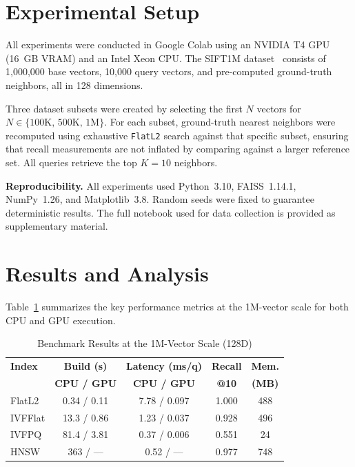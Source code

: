 \documentclass[conference]{IEEEtran}
\begin{document}
\section{Experimental Setup}
All experiments were conducted in Google Colab using an NVIDIA T4 GPU (16~GB VRAM) and an Intel Xeon CPU. The SIFT1M dataset~\cite{annbench2022} consists of 1,000,000 base vectors, 10,000 query vectors, and pre-computed ground-truth neighbors, all in 128 dimensions.

Three dataset subsets were created by selecting the first $N$ vectors for $N\in\{100\textrm{K},\,500\textrm{K},\,1\textrm{M}\}$. For each subset, ground-truth nearest neighbors were recomputed using exhaustive \texttt{FlatL2} search against that specific subset, ensuring that recall measurements are not inflated by comparing against a larger reference set. All queries retrieve the top $K\!=\!10$ neighbors.

\textbf{Reproducibility.} All experiments used Python~3.10, FAISS~1.14.1, NumPy~1.26, and Matplotlib~3.8. Random seeds were fixed to guarantee deterministic results. The full notebook used for data collection is provided as supplementary material.

\section{Results and Analysis}

Table~\ref{tab:results} summarizes the key performance metrics at the 1M-vector scale for both CPU and GPU execution.

\begin{table}[htbp]
\caption{Benchmark Results at the 1M-Vector Scale (128D)}
\label{tab:results}
\centering
\begin{tabular}{@{}lcccc@{}}
\toprule
\textbf{Index} & \textbf{Build (s)} & \textbf{Latency (ms/q)} & \textbf{Recall} & \textbf{Mem.} \\
               & \textbf{CPU / GPU} & \textbf{CPU / GPU} & \textbf{@10} & \textbf{(MB)} \\
\midrule
FlatL2  & 0.34 / 0.11 & 7.78 / 0.097 & 1.000 & 488 \\
IVFFlat & 13.3 / 0.86 & 1.23 / 0.037 & 0.928 & 496 \\
IVFPQ   & 81.4 / 3.81 & 0.37 / 0.006 & 0.551 & 24 \\
HNSW    & 363 / ---   & 0.52 / ---   & 0.977 & 748 \\
\bottomrule
\end{tabular}
\end{table}
\end{document}
